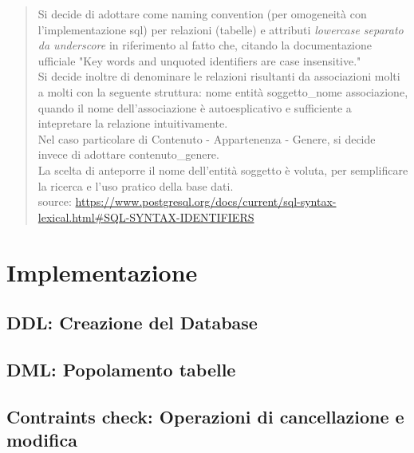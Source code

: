 \documentclass[a4paper]{article}
\begin{document}
\begin{quotation}\footnotesize
  Si decide di adottare come naming convention (per omogeneità con l'implementazione sql) per relazioni (tabelle) 
  e attributi \emph{lowercase separato da underscore}
  in riferimento al fatto che, citando la documentazione ufficiale 
  "Key words and unquoted identifiers are case insensitive."\\
  Si decide inoltre di denominare le relazioni risultanti da associazioni molti a molti con la seguente struttura:
  {nome entità soggetto}\_{nome associazione}, quando il nome dell'associazione è autoesplicativo e sufficiente
  a intepretare la relazione intuitivamente.\\
  Nel caso particolare di Contenuto - Appartenenza - Genere, si decide invece di adottare contenuto\_genere.\\
  La scelta di anteporre il nome dell'entità soggetto è voluta, per semplificare la ricerca e l'uso pratico 
  della base dati.\\
  source: \url{https://www.postgresql.org/docs/current/sql-syntax-lexical.html#SQL-SYNTAX-IDENTIFIERS}
\end{quotation}
\clearpage
\section{Implementazione}
\subsection{DDL: Creazione del Database}
\subsection{DML: Popolamento tabelle}
\subsection{Contraints check: Operazioni di cancellazione e modifica}
\end{document}
